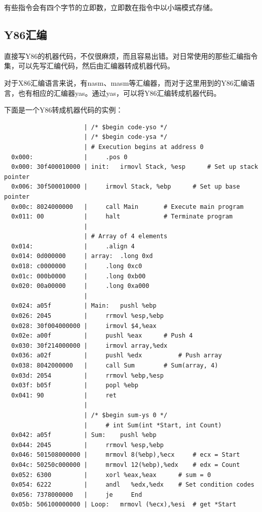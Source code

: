 有些指令会有四个字节的立即数，立即数在指令中以小端模式存储。

\subsection{Y86汇编}\label{y86ux6c47ux7f16}

直接写Y86的机器代码，不仅很麻烦，而且容易出错。对日常使用的那些汇编指令集，可以先写汇编代码，然后由汇编器转成机器代码。

对于X86汇编语言来说，有nasm、masm等汇编器，而对于这里用到的Y86汇编语言，也有相应的汇编器yas。通过yas，可以将Y86汇编转成机器代码。

下面是一个Y86转成机器代码的实例：

\begin{verbatim}
                      | /* $begin code-yso */
                      | /* $begin code-ysa */
                      | # Execution begins at address 0 
  0x000:              |     .pos 0 
  0x000: 30f400010000 | init:   irmovl Stack, %esp      # Set up stack pointer  
  0x006: 30f500010000 |     irmovl Stack, %ebp      # Set up base pointer   
  0x00c: 8024000000   |     call Main       # Execute main program
  0x011: 00           |     halt            # Terminate program 
                      | 
                      | # Array of 4 elements
  0x014:              |     .align 4    
  0x014: 0d000000     | array:  .long 0xd
  0x018: c0000000     |     .long 0xc0
  0x01c: 000b0000     |     .long 0xb00
  0x020: 00a00000     |     .long 0xa000    
                      | 
  0x024: a05f         | Main:   pushl %ebp 
  0x026: 2045         |     rrmovl %esp,%ebp
  0x028: 30f004000000 |     irmovl $4,%eax  
  0x02e: a00f         |     pushl %eax      # Push 4
  0x030: 30f214000000 |     irmovl array,%edx
  0x036: a02f         |     pushl %edx          # Push array
  0x038: 8042000000   |     call Sum        # Sum(array, 4)
  0x03d: 2054         |     rrmovl %ebp,%esp
  0x03f: b05f         |     popl %ebp
  0x041: 90           |     ret 
                      | 
                      | /* $begin sum-ys 0 */
                      |     # int Sum(int *Start, int Count)
  0x042: a05f         | Sum:    pushl %ebp
  0x044: 2045         |     rrmovl %esp,%ebp
  0x046: 501508000000 |     mrmovl 8(%ebp),%ecx     # ecx = Start
  0x04c: 50250c000000 |     mrmovl 12(%ebp),%edx    # edx = Count
  0x052: 6300         |     xorl %eax,%eax      # sum = 0
  0x054: 6222         |     andl   %edx,%edx    # Set condition codes
  0x056: 7378000000   |     je     End
  0x05b: 506100000000 | Loop:   mrmovl (%ecx),%esi  # get *Start

\end{verbatim}
